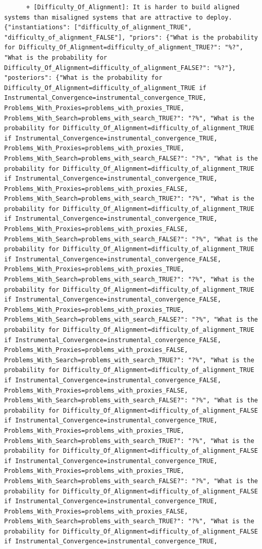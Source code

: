 \documentclass[
  11pt,
  letterpaper,
]{book}
\begin{document}
\begin{verbatim}
      + [Difficulty_Of_Alignment]: It is harder to build aligned systems than misaligned systems that are attractive to deploy. {"instantiations": ["difficulty_of_alignment_TRUE", "difficulty_of_alignment_FALSE"], "priors": {"What is the probability for Difficulty_Of_Alignment=difficulty_of_alignment_TRUE?": "%?", "What is the probability for Difficulty_Of_Alignment=difficulty_of_alignment_FALSE?": "%?"}, "posteriors": {"What is the probability for Difficulty_Of_Alignment=difficulty_of_alignment_TRUE if Instrumental_Convergence=instrumental_convergence_TRUE, Problems_With_Proxies=problems_with_proxies_TRUE, Problems_With_Search=problems_with_search_TRUE?": "?%", "What is the probability for Difficulty_Of_Alignment=difficulty_of_alignment_TRUE if Instrumental_Convergence=instrumental_convergence_TRUE, Problems_With_Proxies=problems_with_proxies_TRUE, Problems_With_Search=problems_with_search_FALSE?": "?%", "What is the probability for Difficulty_Of_Alignment=difficulty_of_alignment_TRUE if Instrumental_Convergence=instrumental_convergence_TRUE, Problems_With_Proxies=problems_with_proxies_FALSE, Problems_With_Search=problems_with_search_TRUE?": "?%", "What is the probability for Difficulty_Of_Alignment=difficulty_of_alignment_TRUE if Instrumental_Convergence=instrumental_convergence_TRUE, Problems_With_Proxies=problems_with_proxies_FALSE, Problems_With_Search=problems_with_search_FALSE?": "?%", "What is the probability for Difficulty_Of_Alignment=difficulty_of_alignment_TRUE if Instrumental_Convergence=instrumental_convergence_FALSE, Problems_With_Proxies=problems_with_proxies_TRUE, Problems_With_Search=problems_with_search_TRUE?": "?%", "What is the probability for Difficulty_Of_Alignment=difficulty_of_alignment_TRUE if Instrumental_Convergence=instrumental_convergence_FALSE, Problems_With_Proxies=problems_with_proxies_TRUE, Problems_With_Search=problems_with_search_FALSE?": "?%", "What is the probability for Difficulty_Of_Alignment=difficulty_of_alignment_TRUE if Instrumental_Convergence=instrumental_convergence_FALSE, Problems_With_Proxies=problems_with_proxies_FALSE, Problems_With_Search=problems_with_search_TRUE?": "?%", "What is the probability for Difficulty_Of_Alignment=difficulty_of_alignment_TRUE if Instrumental_Convergence=instrumental_convergence_FALSE, Problems_With_Proxies=problems_with_proxies_FALSE, Problems_With_Search=problems_with_search_FALSE?": "?%", "What is the probability for Difficulty_Of_Alignment=difficulty_of_alignment_FALSE if Instrumental_Convergence=instrumental_convergence_TRUE, Problems_With_Proxies=problems_with_proxies_TRUE, Problems_With_Search=problems_with_search_TRUE?": "?%", "What is the probability for Difficulty_Of_Alignment=difficulty_of_alignment_FALSE if Instrumental_Convergence=instrumental_convergence_TRUE, Problems_With_Proxies=problems_with_proxies_TRUE, Problems_With_Search=problems_with_search_FALSE?": "?%", "What is the probability for Difficulty_Of_Alignment=difficulty_of_alignment_FALSE if Instrumental_Convergence=instrumental_convergence_TRUE, Problems_With_Proxies=problems_with_proxies_FALSE, Problems_With_Search=problems_with_search_TRUE?": "?%", "What is the probability for Difficulty_Of_Alignment=difficulty_of_alignment_FALSE if Instrumental_Convergence=instrumental_convergence_TRUE, 
\end{verbatim}
\end{document}

